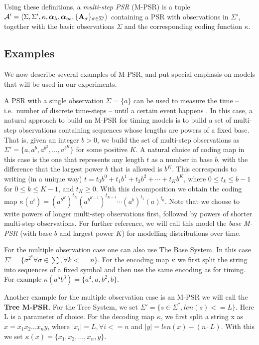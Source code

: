 Using these definitions, a \emph{multi-step PSR} (M-PSR) is a tuple $\mathcal{A}' = \langle \Sigma, \Sigma', \kappa, \boldsymbol{\alpha}_\lambda, \boldsymbol{\alpha}_{\infty}, \{\mathbf{A}_\sigma\}_{\sigma \in \Sigma'} \rangle$ containing a PSR with observations in $\Sigma'$, together with the basic observations $\Sigma$ and the corresponding coding function $\kappa$.


\subsection{Examples}

We now describe several examples of M-PSR, and put special emphasis on models that will be used in our experiments.

A PSR with a single observation $\Sigma = \{a\}$ can be used to measure the time -- i.e.\ number of discrete time-steps -- until a certain event happens \cite{ODM}. In this case, a natural approach to build an M-PSR for timing models is to build a set of multi-step observations containing sequences whose lengths are powers of a fixed base. That is, given an integer $b > 0$, we build the set of multi-step observations as $\Sigma' = \{a,a^b, a^{b^2}, \ldots, a^{b^K}\}$ for some positive $K$. A natural choice of coding map in this case is the one that represents any length $t$ as a number in base $b$, with the difference that the largest power $b$ that is allowed is $b^K$. This corresponds to writing (in a unique way) $t = t_0 b^0 + t_1 b^1 + t_2 b^2 + \cdots + t_K b^K$, where $0 \leq t_k \leq b - 1$ for $0 \leq k \leq K-1$, and $t_K \geq 0$. With this decomposition we obtain the coding map $\kappa(a^t) = (a^{b^K})^{t_K} (a^{b^{K-1}})^{t_{K-1}} \cdots (a^b)^{t_1} (a)^{t_0}$. Note that we choose to write powers of longer multi-step observations first, followed by powers of shorter multi-step observations.
%
For further reference, we will call this model the \emph{base M-PSR} (with base $b$ and largest power $K$) for modelling distributions over time.


For the multiple observation case one can also use The Base System. In this case $\Sigma' = \{\sigma^{2^k}\forall \sigma \in \sum, \forall k <= n\}$. For the encoding map $\kappa$ we first split the string into sequences of a fixed symbol and then use the same encoding as for timing. For example $\kappa(a^5b^3)=\{a^4,a,b^2,b\}$.
 
Another example for the multiple observation case is an M-PSR we will call the \textbf{Tree M-PSR}. For the Tree System, we set $\Sigma'= \{s \in \Sigma^{*}, len(s)<= L\}$. Here L is a parameter of choice. For the decoding map $\kappa$, we first split a string x as $x=x_1x_2...x_ny$, where $|x_i|=L, \forall i<=n$ and $|y|=len(x) - (n \cdot L)$. With this we set $\kappa(x) = \{x_1,x_2,...,x_n,y\}$.

